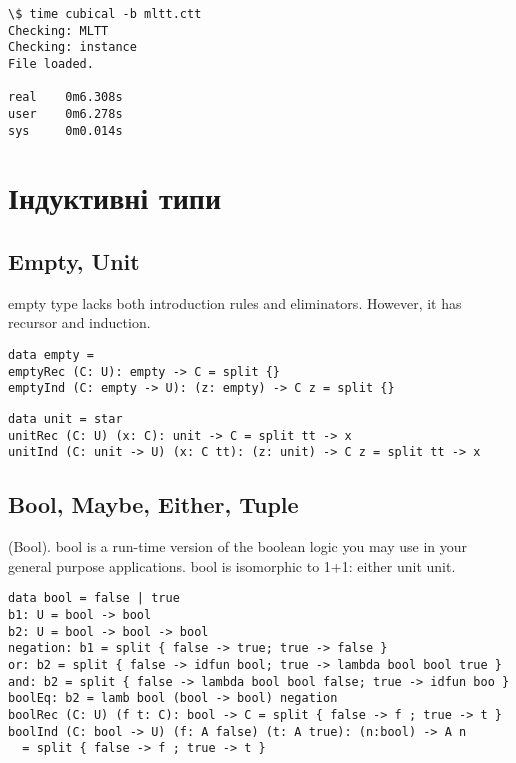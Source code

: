 \begin{lstlisting}
\$ time cubical -b mltt.ctt
Checking: MLTT
Checking: instance
File loaded.

real    0m6.308s
user    0m6.278s
sys     0m0.014s
\end{lstlisting}

\section{Індуктивні типи}

\subsection{Empty, Unit}

empty type lacks both introduction rules and eliminators. However, it has recursor and induction.

\begin{lstlisting}
data empty =
emptyRec (C: U): empty -> C = split {}
emptyInd (C: empty -> U): (z: empty) -> C z = split {}
\end{lstlisting}

\begin{lstlisting}
data unit = star
unitRec (C: U) (x: C): unit -> C = split tt -> x
unitInd (C: unit -> U) (x: C tt): (z: unit) -> C z = split tt -> x
\end{lstlisting}

\subsection{Bool, Maybe, Either, Tuple}

\begin{definition} (Bool).
bool is a run-time version of the boolean logic you may use
in your general purpose applications. bool is isomorphic
to 1+1: either unit unit.
\begin{lstlisting}
data bool = false | true
b1: U = bool -> bool
b2: U = bool -> bool -> bool
negation: b1 = split { false -> true; true -> false }
or: b2 = split { false -> idfun bool; true -> lambda bool bool true }
and: b2 = split { false -> lambda bool bool false; true -> idfun boo }
boolEq: b2 = lamb bool (bool -> bool) negation
boolRec (C: U) (f t: C): bool -> C = split { false -> f ; true -> t }
boolInd (C: bool -> U) (f: A false) (t: A true): (n:bool) -> A n
  = split { false -> f ; true -> t }
\end{lstlisting}
\end{definition}

